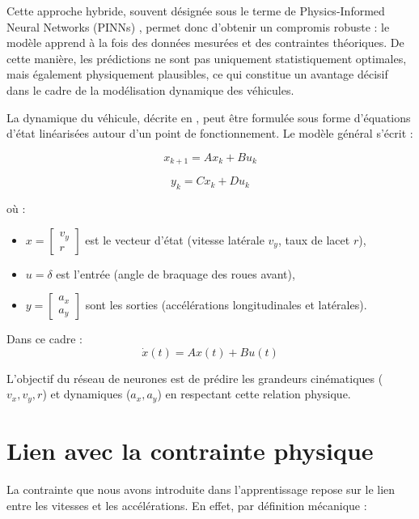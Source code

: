 \documentclass[12pt, a4paper]{report}
\begin{document}
Cette approche hybride, souvent désignée sous le terme de Physics-Informed Neural Networks (PINNs) \cite{Raissi2019}, permet donc d’obtenir un compromis robuste : le modèle apprend à la fois des données mesurées et des contraintes théoriques. De cette manière, les prédictions ne sont pas uniquement statistiquement optimales, mais également physiquement plausibles, ce qui constitue un avantage décisif dans le cadre de la modélisation dynamique des véhicules.

 La dynamique du véhicule, décrite en \cite{Rajamani2011}, peut être formulée sous forme d'équations d'état linéarisées autour d'un point de fonctionnement. Le modèle général s'écrit : 

\begin{equation}
    x_{k+1} = A x_k + B u_k
\end{equation}

\begin{equation}
    y_k = C x_k + D u_k
\end{equation}

où :
\begin{itemize}
    \item $x = \begin{bmatrix} v_y \\ r \end{bmatrix}$ est le vecteur d’état (vitesse latérale $v_y$, taux de lacet $r$),
    \item $u = \delta$ est l’entrée (angle de braquage des roues avant),
    \item $y = \begin{bmatrix} a_x \\ a_y \end{bmatrix}$ sont les sorties (accélérations longitudinales et latérales).
\end{itemize}

Dans ce cadre :
\begin{equation}
    \dot{x}(t) = A x(t) + B u(t)
\end{equation}

L’objectif du réseau de neurones est de prédire les grandeurs cinématiques ($v_x, v_y, r$) et dynamiques ($a_x, a_y$) en respectant cette relation physique.

\section{Lien avec la contrainte physique}

La contrainte que nous avons introduite dans l’apprentissage repose sur le lien entre les vitesses et les accélérations. En effet, par définition mécanique :
\end{document}
